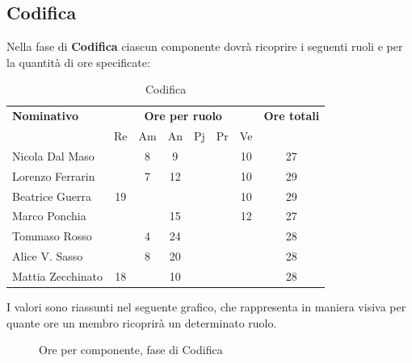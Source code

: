 \subsection{Codifica}
Nella fase di \textbf{Codifica} ciascun componente dovrà ricoprire i seguenti ruoli e per la quantità di ore specificate:

\begin{table}[H]
	\centering
	\begin{tabular}{|l|c|c|c|c|c|c|c|}
		\hline
		\textbf{Nominativo} & 
		\multicolumn{6}{c|}{\textbf{Ore per ruolo}} & 
		\textbf{Ore totali} \\
		& Re & Am & An & Pj & Pr & Ve & \\
		\hline
		Nicola Dal Maso & & 8 & 9 & & & 10 & 27 \\
		Lorenzo Ferrarin & & 7 & 12 & & & 10 & 29 \\
		Beatrice Guerra & 19 & & & & & 10 & 29 \\
		Marco Ponchia & & & 15 & & & 12 & 27 \\
		Tommaso Rosso & & 4 & 24 & & & & 28 \\
		Alice V. Sasso & & 8 & 20 & & & & 28 \\
		Mattia Zecchinato & 18 & & 10 & & & & 28 \\
		\hline
	\end{tabular}
	\caption{Codifica}
\end{table}
I valori sono riassunti nel seguente grafico, che rappresenta in maniera visiva per quante ore un membro ricoprirà un determinato ruolo.
\begin{figure}[H]
	\centering
	\caption{Ore per componente, fase di Codifica}
\end{figure}

